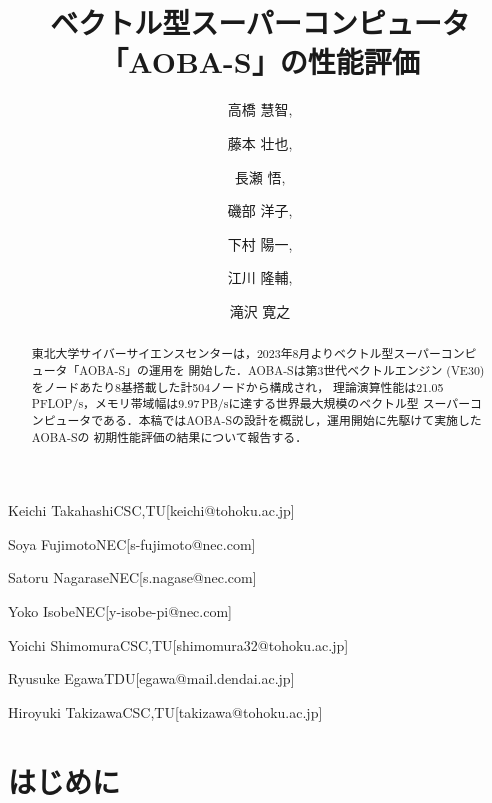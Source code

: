 ﻿\documentclass[submit,techrep,noauthor]{ipsj}
\begin{document}
\title{ベクトル型スーパーコンピュータ「AOBA-S」の性能評価}



\author{高橋 慧智,}{Keichi Takahashi}{CSC,TU}[keichi@tohoku.ac.jp]
\author{藤本 壮也,}{Soya Fujimoto}{NEC}[s-fujimoto@nec.com]
\author{長瀬 悟,}{Satoru Nagarase}{NEC}[s.nagase@nec.com]
\author{磯部 洋子,}{Yoko Isobe}{NEC}[y-isobe-pi@nec.com]
\author{下村 陽一,}{Yoichi Shimomura}{CSC,TU}[shimomura32@tohoku.ac.jp]
\author{江川 隆輔,}{Ryusuke Egawa}{TDU}[egawa@mail.dendai.ac.jp]
\author{滝沢 寛之}{Hiroyuki Takizawa}{CSC,TU}[takizawa@tohoku.ac.jp]

\begin{abstract}
東北大学サイバーサイエンスセンターは，2023年8月よりベクトル型スーパーコンピュータ「AOBA-S」の運用を
開始した．AOBA-Sは第3世代ベクトルエンジン (VE30) をノードあたり8基搭載した計504ノードから構成され，
理論演算性能は21.05\,PFLOP/s，メモリ帯域幅は9.97\,PB/sに達する世界最大規模のベクトル型
スーパーコンピュータである．本稿ではAOBA-Sの設計を概説し，運用開始に先駆けて実施したAOBA-Sの
初期性能評価の結果について報告する．
\end{abstract}

%
%
%

\maketitle

\section{はじめに}
\end{document}
